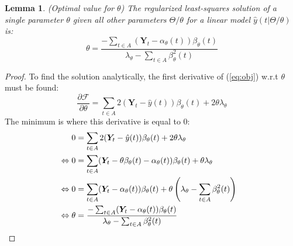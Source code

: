 \documentclass[10pt]{proc}
\newtheorem{lemma}{Lemma}
\newtheorem{proof}{Proof}
\begin{document}
\begin{lemma}
    (Optimal value for $\theta$) The regularized least-squares solution of a
    single parameter $\theta$ given all other parameters $\Theta / {\theta}$ for
    a linear model $\hat{y}(t| \Theta / {\theta})$ is:
    \begin{equation}  \label{eq:theta-update}
        \theta =
            \frac{-\sum_{t \in A} (\bm{Y}_t - \alpha_\theta(t)) \beta_\theta(t)}
                 {\lambda_\theta - \sum_{t \in A} \beta_\theta^2(t)}
    \end{equation}
\end{lemma}

\begin{proof}
    To find the solution analytically, the first derivative of (\ref{eq:obj})
    w.r.t $\theta$ must be found:
    \begin{equation} \label{eq:ipr-obj-derivative}
        \frac{ \partial \mathcal{F}}{ \partial\theta } =
            \sum_{t \in A} 2(\bm{Y}_t - \hat{y}(t)) \beta_\theta(t) +
            2\theta\lambda_\theta
    \end{equation}
    The minimum is where this derivative is equal to 0:
    {\footnotesize
    \begin{align*}
        & \hphantom{==} \begin{aligned}[t]
            0 &=
            \sum_{t \in A} 2(\bm{Y}_t - \hat{y}(t)) \beta_\theta(t) +
            2\theta\lambda_\theta
        \end{aligned} \\
        & \Leftrightarrow \begin{aligned}[t]
            0 &=
            \sum_{t \in A} (\bm{Y}_t - \theta\beta_\theta(t) - \alpha_\theta(t))
                \beta_\theta(t) +
                \theta\lambda_\theta
        \end{aligned} \\
        & \Leftrightarrow \begin{aligned}[t]
            0 &=
            \sum_{t \in A} (\bm{Y}_t - \alpha_\theta(t)) \beta_\theta(t) +
            \theta \left(\lambda_\theta - \sum_{t \in A} \beta_\theta^2(t)\right)
        \end{aligned} \\
        & \Leftrightarrow \begin{aligned}[t]
            \theta &=
                \frac{-\sum_{t \in A} (\bm{Y}_t - \alpha_\theta(t)) \beta_\theta(t)}
                     {\lambda_\theta - \sum_{t \in A} \beta_\theta^2(t)}
        \end{aligned}
    \end{align*}%
    }%
\end{proof}
\end{document}
